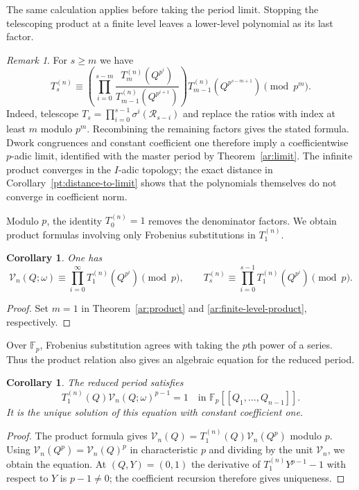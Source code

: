 \documentclass[11pt]{amsart}
\newtheorem{corollary}[theorem]{Corollary}
\theoremstyle{definition}
\theoremstyle{remark}
\newtheorem{remark}[theorem]{Remark}
\numberwithin{equation}{section}
\newcommand{\F}{\mathbb F}
\begin{document}
The same calculation applies before taking the period limit.
Stopping the telescoping product at a finite level leaves a
lower-level polynomial as its last factor.

\begin{remark}\label{ar:finite-product}
For $s\geq m$ we have
\begin{equation}\label{ar:finite-level-product}
 T_s^{(n)}\equiv
 \left(\prod_{i=0}^{s-m}
   \frac{T_m^{(n)}(Q^{p^i})}
        {T_{m-1}^{(n)}(Q^{p^{i+1}})}\right)
 T_{m-1}^{(n)}(Q^{p^{s-m+1}})\pmod{p^m}.
\end{equation}
Indeed, telescope
$T_s=\prod_{i=0}^{s-1}\sigma^i(\mathcal R_{s-i})$ and replace
the ratios with index at least $m$ modulo $p^m$. Recombining the
remaining factors gives the stated formula. Dwork congruences
and constant coefficient one therefore imply a coefficientwise
$p$-adic limit, identified with the master period by
Theorem~\ref{ar:limit}. The infinite product converges in the
$I$-adic topology; the exact distance in Corollary~\ref{pt:distance-to-limit} shows
that the polynomials themselves do not converge in coefficient norm.
\end{remark}

Modulo $p$, the identity $T_0^{(n)}=1$ removes the denominator
factors. We obtain product formulas involving only
Frobenius substitutions in $T_1^{(n)}$.

\begin{corollary}\label{ar:mod-p-product}
One has
\[
 \mathcal V_n(Q;\omega)\equiv
 \prod_{i=0}^{\infty}T_1^{(n)}(Q^{p^i})\pmod p,
 \qquad
 T_s^{(n)}\equiv\prod_{i=0}^{s-1}T_1^{(n)}(Q^{p^i})\pmod p.
\]
\end{corollary}

\begin{proof}
Set $m=1$ in Theorem~\ref{ar:product} and
\eqref{ar:finite-level-product}, respectively.
\end{proof}

Over $\F_p$, Frobenius substitution agrees with taking the
$p$th power of a series. Thus the product relation also gives an
algebraic equation for the reduced period.

\begin{corollary}\label{ar:algebraicity}
The reduced period satisfies
\[
 T_1^{(n)}(Q)\mathcal V_n(Q;\omega)^{p-1}=1
 \quad\text{in }\F_p[[Q_1,\ldots,Q_{n-1}]].
\]
It is the unique solution of this equation with constant coefficient one.
\end{corollary}
\begin{proof}
The product formula gives
$\mathcal V_n(Q)=T_1^{(n)}(Q)\mathcal V_n(Q^p)$ modulo $p$.
Using $\mathcal V_n(Q^p)=\mathcal V_n(Q)^p$ in characteristic
$p$ and dividing by the unit $\mathcal V_n$, we obtain the
equation. At $(Q,Y)=(0,1)$ the derivative of
$T_1^{(n)}Y^{p-1}-1$ with respect to $Y$ is $p-1\ne0$;
the coefficient recursion therefore gives uniqueness.
\end{proof}
\end{document}
